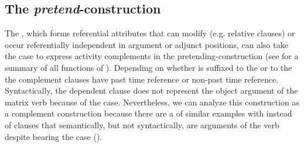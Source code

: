 
\subsection{The \textit{pretend}-construction}
\label{ssec:PretendConstruction}
The  , which forms referential attributes that can modify  (e.g. relative clauses) or occur referentially independent in argument or adjunct positions, can also take the  case to express activity complements in the pretending-construction  (see  for a summary of all functions of ). Depending on whether  is suffixed to the   or to the   the complement clauses have past time reference or non-past time reference. Syntactically, the dependent clause does not represent the object argument of the matrix verb  because of the  case. Nevertheless, we can analyze this construction as a complement construction because there are a  of similar examples with  instead of clauses that semantically, but not syntactically, are arguments of the verb  despite bearing the  case ().
%
